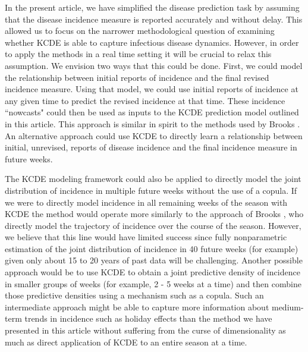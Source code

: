 \documentclass[times, doublespace]{simauth}\usepackage[]{graphicx}\usepackage[]{color}
\begin{document}
In the present article, we have simplified the disease prediction task by
assuming that the disease incidence measure is reported accurately and without delay.
This allowed us to focus on the narrower methodological question of
examining whether KCDE is able to capture infectious disease dynamics.
However, in order to apply the methods in a real time setting it will be
crucial to relax this assumption.  We envision two ways that this could be done.
First, we could model the relationship between initial reports of incidence
and the final revised incidence measure.  Using that model, we could use
initial reports of incidence at any given time to predict the revised incidence at
that time.  These incidence ``nowcasts" could then be used as inputs
to the KCDE prediction model outlined in this article.  This approach is similar
in spirit to the methods used by Brooks \etal \cite{brooks2015empiricalBayes}.
An alternative approach could use KCDE to directly learn a relationship between
initial, unrevised, reports of disease incidence and the final incidence measure in future weeks.

The KCDE modeling framework could also be applied to directly model the joint distribution
of incidence in multiple future weeks without the use of a copula.  If we were to directly
model incidence in all remaining weeks of the season with KCDE the method would operate
more similarly to the approach of Brooks \etal \cite{brooks2015empiricalBayes}, who directly model
the trajectory of incidence over the course of the season.  However, we believe that this
line would have limited success since fully nonparametric estimation of the joint distribution of
incidence in 40 future weeks (for example) given only about 15 to 20 years of past data will
be challenging.  Another possible approach would be
to use KCDE to obtain a joint predictive density of incidence in smaller groups of weeks
(for example, 2 - 5 weeks at a time) and then combine
those predictive densities using a mechanism such as a copula.
Such an intermediate approach might be able to capture more information about
medium-term trends in incidence such as holiday effects than the method we have presented in this article
without suffering from the curse of dimensionality as much as direct application of KCDE to
an entire season at a time.
\end{document}

